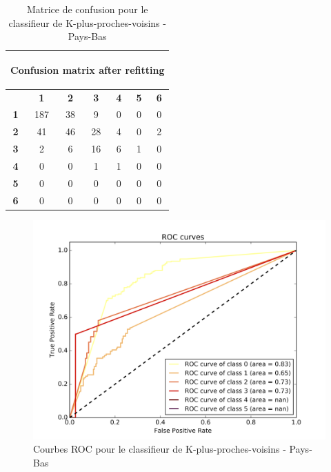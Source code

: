 \documentclass{book}
\begin{document}
\begin{table}[H]
  \begin{center}
  \begin{adjustbox}{max width=\textwidth}
  \begin{tabular}{|c|c|c|c|c|c|c|}
    \hline
    \multicolumn{7}{|c|}{{ \begin{bf}Confusion matrix after refitting\end{bf}}} \\
    \hline
     & \textbf{1} & \textbf{2} & \textbf{3} & \textbf{4} & \textbf{5} & \textbf{6}\\
    \hline
    \textbf{1} & 187 & 38 & 9 & 0 & 0 & 0\\
    \hline
    \textbf{2} & 41 & 46 & 28 & 4 & 0 & 2\\
    \hline
    \textbf{3} & 2 & 6 & 16 & 6 & 1 & 0\\
    \hline
    \textbf{4} & 0 & 0 & 1 & 1 & 0 & 0\\
    \hline
    \textbf{5} & 0 & 0 & 0 & 0 & 0 & 0\\
    \hline
    \textbf{6} & 0 & 0 & 0 & 0 & 0 & 0\\
    \hline
  \end{tabular}
  \end{adjustbox}
  \end{center}
  \caption{Matrice de confusion pour le classifieur de K-plus-proches-voisins - Pays-Bas}
  \label{knn_cm_pays-bas}
\end{table}

\begin{figure}[H]
 \begin{center}
\includegraphics[scale=0.4]{../../data/Pays-Bas/test/Nearest_Neighboors_Classification/Nearest_Neighboors_Classification_roc.png}
 \end{center}
 \caption{Courbes ROC pour le classifieur de K-plus-proches-voisins - Pays-Bas}
 \label{knn_roc_pays-bas}
\end{figure}
\end{document}
